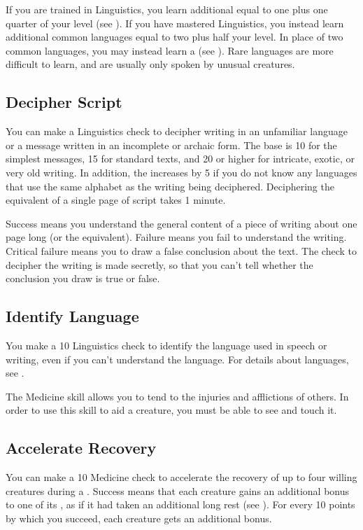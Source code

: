         \label{Learning Languages}
        If you are trained in Linguistics, you learn additional  equal to one plus one quarter of your level (see ).
        If you have mastered Linguistics, you instead learn additional common languages equal to two plus half your level.
        In place of two common languages, you may instead learn a  (see ).
        Rare languages are more difficult to learn, and are usually only spoken by unusual creatures.

    \subsection{Decipher Script}
        You can make a Linguistics check to decipher writing in an unfamiliar language or a message written in an incomplete or archaic form. The base  is 10 for the simplest messages, 15 for standard texts, and 20 or higher for intricate, exotic, or very old writing. In addition, the  increases by 5 if you do not know any languages that use the same alphabet as the writing being deciphered. Deciphering the equivalent of a single page of script takes 1 minute.

        Success means you understand the general content of a piece of writing about one page long (or the equivalent). Failure means you fail to understand the writing. Critical failure means you to draw a false conclusion about the text. The check to decipher the writing is made secretly, so that you can't tell whether the conclusion you draw is true or false.

    \subsection{Identify Language}
        You make a  10 Linguistics check to identify the language used in speech or writing, even if you can't understand the language.
        For details about languages, see .

\newpage
{}
        The Medicine skill allows you to tend to the injuries and afflictions of others.
        In order to use this skill to aid a creature, you must be able to see and touch it.

    \subsection{Accelerate Recovery}\label{Accelerate Recovery}
        You can make a  10 Medicine check to accelerate the recovery of up to four willing creatures during a .
        Success means that each creature gains an additional  bonus to one of its , as if it had taken an additional long rest (see ).
        For every 10 points by which you succeed, each creature gets an additional  bonus.

